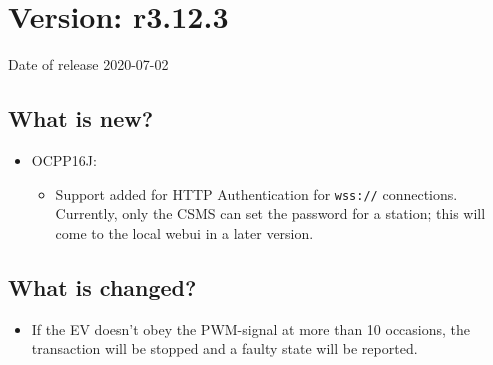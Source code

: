 \documentclass{scrartcl}
\begin{document}
\section{Version: r3.12.3}
Date of release 2020-07-02
\subsection*{What is new?}
\begin{itemize}
\item OCPP16J:
  \begin{itemize}
  \item Support added for HTTP Authentication for \verb|wss://|
    connections. Currently, only the CSMS can set the password for a station;
    this will come to the local webui in a later version.
  \end{itemize}
\end{itemize}
\subsection*{What is changed?}
\begin{itemize}
\item If the EV doesn't obey the PWM-signal at more than 10 occasions, the
  transaction will be stopped and a faulty state will be reported.
\end{itemize}
\end{document}
